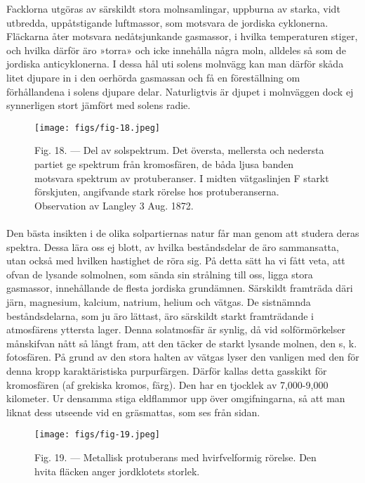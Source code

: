 \documentclass[a4paper, 12pt, oneside, swedish]{article}
\begin{document}
Facklorna utgöras av särskildt stora molnsamlingar, uppburna av starka, vidt utbredda, uppåtstigande luftmassor, som motsvara de jordiska cyklonerna. Fläckarna åter motsvara nedåtsjunkande gasmassor, i hvilka temperaturen stiger, och hvilka därför äro »torra» och icke innehålla några moln, alldeles så som de jordiska anticyklonerna. I dessa hål uti solens molnvägg kan man därför skåda litet djupare in i den oerhörda gasmassan och få en föreställning om förhållandena i solens djupare delar. Naturligtvis är djupet i molnväggen dock ej synnerligen stort jämfört med solens radie.

\begin{figure}[H]
\centering
\texttt{[image: figs/fig-18.jpeg]}
\caption{Fig. 18. --- Del av solspektrum. Det översta, mellersta och nedersta partiet ge spektrum från kromosfären, de båda ljusa banden motsvara spektrum av protuberanser. I midten vätgaslinjen F starkt förskjuten, angifvande stark rörelse hos protuberanserna. Observation av Langley 3 Aug. 1872.}
\end{figure}
\paragraph{}
Den bästa insikten i de olika solpartiernas natur får man genom att studera deras spektra. Dessa lära oss ej blott, av hvilka beståndsdelar de äro sammansatta, utan också med hvilken hastighet de röra sig. På detta sätt ha vi fått veta, att ofvan de lysande solmolnen, som sända sin strålning till oss, ligga stora gasmassor, innehållande de flesta jordiska grundämnen. Särskildt framträda däri järn, magnesium, kalcium, natrium, helium och vätgas. De sistnämnda beståndsdelarna, som ju äro lättast, äro särskildt starkt framträdande i atmosfärens yttersta lager. Denna solatmosfär är synlig, då vid solförmörkelser månskifvan nått så långt fram, att den täcker de starkt lysande molnen, den s, k. fotosfären. På grund av den stora halten av vätgas lyser den vanligen med den för denna kropp karaktäristiska purpurfärgen. Därför kallas detta gasskikt för kromosfären (af grekiska kromos, färg). Den har en tjocklek av 7,000-9,000 kilometer. Ur densamma stiga eldflammor upp över omgifningarna, så att man liknat dess utseende vid en gräsmattas, som ses från sidan.

\begin{figure}[H]
\centering
\texttt{[image: figs/fig-19.jpeg]}
\caption{Fig. 19. --- Metallisk protuberans med hvirfvelformig rörelse. Den hvita fläcken anger jordklotets storlek.}
\end{figure}
\end{document}
